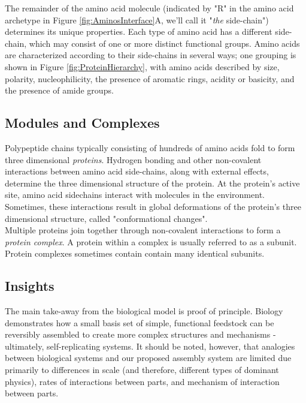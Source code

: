 {The remainder of the amino acid molecule (indicated by "R" in the amino acid archetype in Figure \ref{fig:AminosInterface}A, we'll call it "\textit{the} side-chain") determines its unique properties.  Each type of amino acid has a different side-chain, which may consist of one or more distinct functional groups.  Amino acids are characterized according to their side-chains in several ways; one grouping is shown in Figure \ref{fig:ProteinHierarchy}, with amino acids described by size, polarity, nucleophilicity, the presence of aromatic rings, acidity or basicity, and the presence of amide groups.\\

 \subsection{Modules and Complexes}

Polypeptide chains typically consisting of hundreds of amino acids fold to form three dimensional \textit{proteins}.  Hydrogen bonding and other non-covalent interactions between amino acid side-chains, along with external effects, determine the three dimensional structure of the protein.  At the protein's active site, amino acid sidechains interact with molecules in the environment.  Sometimes, these interactions result in global deformations of the protein's three dimensional structure, called "conformational changes".\\

Multiple proteins join together through non-covalent interactions to form a \textit{protein complex}.  A protein within a complex is usually referred to as a subunit.  Protein complexes sometimes contain contain many identical subunits.

\subsection{Insights}

The main take-away from the biological model is proof of principle.  Biology demonstrates how a small basis set of simple, functional feedstock can be reversibly assembled to create more complex structures and mechanisms - ultimately, self-replicating systems.  It should be noted, however, that analogies between biological systems and our proposed assembly system are limited due primarily to differences in scale (and therefore, different types of dominant physics), rates of interactions between parts, and mechanism of interaction between parts.

}
